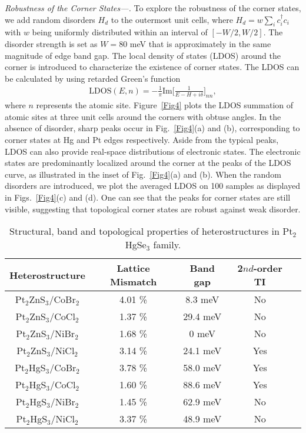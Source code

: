 \documentclass[aps,prl,twocolumn,showpacs,superscriptaddress]{revtex4-1}
\begin{document}
\textit{Robustness of the Corner States---.} To explore the robustness of the corner states, we add random disorders $H_d$ to the outermost unit cells, where $H_d=w\sum_ic_{i}^{\dagger}c_{i}$ with $w$ being uniformly distributed within an interval of $[-W/2,W/2]$. The disorder strength is set as $W=80$ meV that is approximately in the same magnitude of edge band gap. The local density of states (LDOS) around the corner is introduced to characterize the existence of corner states. The LDOS can be calculated by using retarded Green's function
\begin{eqnarray}\label{eq:EffHam_3}
\text{LDOS}(E,n)=-\frac{1}{\pi}\text{Im}\big[\frac{1}{E-H+i\delta}\big]_{nn},
\end{eqnarray}
where $n$ represents the atomic site. Figure~\ref{Fig4} plots the LDOS summation of atomic sites at three unit cells around the corners with obtuse angles. In the absence of disorder, sharp peaks occur in Fig.~\ref{Fig4}(a) and (b), corresponding to corner states at Hg and Pt edges respectively. Aside from the typical peaks, LDOS can also provide real-space distributions of electronic states. The electronic states are predominantly localized around the corner at the peaks of the LDOS curve, as illustrated in the inset of Fig.~\ref{Fig4}(a) and (b). When the random disorders are introduced, we plot the averaged LDOS on 100 samples as displayed in Figs.~\ref{Fig4}(c) and (d). One can see that the peaks for corner states are still visible, suggesting that topological corner states are robust against weak disorder.

\begin{table}
	\caption{Structural, band and topological properties of heterostructures in Pt$_2$HgSe$_3$ family.}
	\begin{ruledtabular}
		\begin{tabular}{ccccc}
			Heterostructure&Lattice Mismatch&Band gap&2${nd}$-order TI \\ \hline
			Pt$_2$ZnS$_3$/CoBr$_2$&4.01 \%  &8.3 meV&No \\
			Pt$_2$ZnS$_3$/CoCl$_2$&1.37 \%  &29.4 meV&No \\
			Pt$_2$ZnS$_3$/NiBr$_2$&1.68 \%  &0 meV&No \\
			Pt$_2$ZnS$_3$/NiCl$_2$&3.14 \%  &24.1 meV&Yes \\
			Pt$_2$HgS$_3$/CoBr$_2$&3.78 \%  &58.0 meV&Yes \\
            Pt$_2$HgS$_3$/CoCl$_2$&1.60 \%  &88.6 meV&Yes \\
            Pt$_2$HgS$_3$/NiBr$_2$&1.45 \%  &62.9 meV&No \\
            Pt$_2$HgS$_3$/NiCl$_2$&3.37 \%  &48.9 meV&No \\
		\end{tabular}
	\end{ruledtabular}
	\label{table-1}
\end{table}
\end{document}
